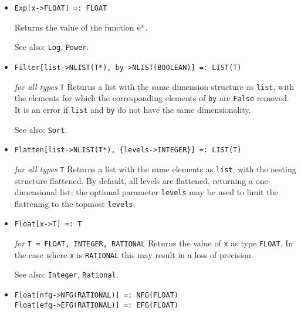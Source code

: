 \begin{itemize}
\item{}
\protect \large \begin{verbatim}
Exp[x->FLOAT] =: FLOAT
\end{verbatim} \normalsize

\bd
Returns the value of the function ${\rm e}^{x}$.
\item [See also:] \verb+Log+, \verb+Power+.
\ed



\item{}
\protect \large \begin{verbatim}
Filter[list->NLIST(T*), by->NLIST(BOOLEAN)] =: LIST(T)
\end{verbatim} \normalsize

{\it for all types} {\tt T}
\bd
Returns a list with the same dimension structure as \verb+list+, with the
elements for which the corresponding elements of \verb+by+ are \verb+False+
removed.  It is an error if \verb+list+ and \verb+by+ do not have the same
dimensionality.
\item [See also:] \verb+Sort+.
\ed

\item{}
\protect \large \begin{verbatim}
Flatten[list->NLIST(T*), {levels->INTEGER}] =: LIST(T)
\end{verbatim} \normalsize

{\it for all types} {\tt T}
\bd
Returns a list with the same elements as \verb+list+, with the nesting
structure flattened.  By default, all levels are flattened, returning
a one-dimensional list; the optional parameter \verb+levels+ may be
used to limit the flattening to the topmost \verb+levels+.
\ed

\item{}
\protect \large \begin{verbatim}
Float[x->T] =: T
\end{verbatim} \normalsize

{\it for} {\tt T = FLOAT, INTEGER, RATIONAL}
\bd
Returns the value of \verb+x+ as type \verb+FLOAT+.
In the case where \verb+x+ is \verb+RATIONAL+ this may result in a loss
of precision.
\item [See also:] \verb+Integer+, \verb+Rational+.
\ed

\item{}
\protect \large \begin{verbatim}
Float[nfg->NFG(RATIONAL)] =: NFG(FLOAT)
Float[efg->EFG(RATIONAL)] =: EFG(FLOAT)
\end{verbatim} \normalsize


\end{itemize}
